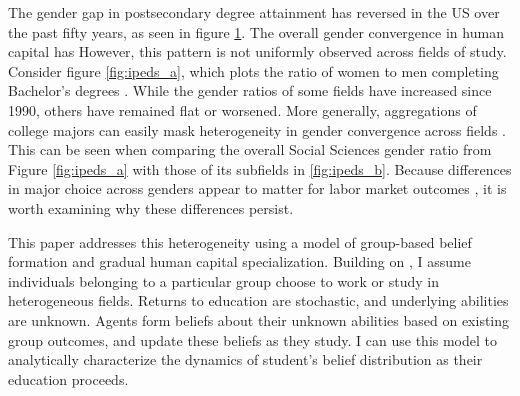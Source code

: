 \begin{figure}[b!] %
\centering

\label{fig:n_degrees}
\end{figure}
\begin{figure}[t!] %
\centering

\end{figure}

The gender gap in postsecondary degree attainment has reversed in the US over the past fifty years, as seen in figure \ref{fig:n_degrees}.
The overall gender convergence in human capital has  
However, this pattern is not uniformly observed across fields of study.
Consider figure \ref{fig:ipeds_a}, which plots the ratio of women to men completing Bachelor's degrees .
While the gender ratios of some fields have increased since 1990, others have remained flat or worsened. 
More generally, aggregations of college majors can easily mask heterogeneity in gender convergence across fields \parencite{BHST08}.
This can be seen when comparing the overall Social Sciences gender ratio from Figure \ref{fig:ipeds_a} with those of its subfields in \ref{fig:ipeds_b}.
Because differences in major choice across genders appear to matter for labor market outcomes \parencite{SHB19}, it is worth examining why these differences persist.

This paper addresses this heterogeneity using a model of group-based belief formation and gradual human capital specialization. 
Building on \textcite{AF20}, I assume individuals belonging to a particular group choose to work or study in heterogeneous fields. 
Returns to education are stochastic, and underlying abilities are unknown.
Agents form beliefs about their unknown abilities based on existing group outcomes, and update these beliefs as they study. 
I can use this model to analytically characterize the dynamics of student's belief distribution as their education proceeds. 

